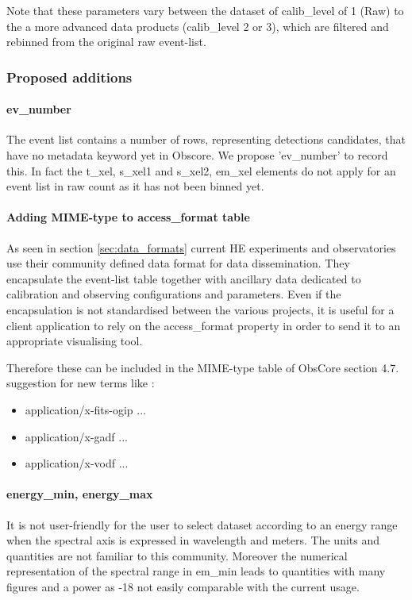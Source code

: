 \documentclass[11pt,a4paper]{ivoa}
\begin{document}
{Note that these parameters vary between the dataset of calib\_level of 1 (Raw) to the a more advanced data products (calib\_level 2 or 3), which are filtered and rebinned from the original raw event-list.


\subsubsection{Proposed additions}

\paragraph{ev\_number}
The event list contains a number of rows, representing detections candidates, that have no metadata keyword yet in Obscore.
We propose 'ev\_number' to record this.
In fact the t\_xel, s\_xel1 and s\_xel2, em\_xel elements do not apply for an event list in raw count as it has not been binned yet.

\paragraph{Adding MIME-type to access\_format table}
As seen in section \ref{sec:data_formats} current HE experiments and observatories use their community defined data format for data dissemination.
They encapsulate the event-list table together with ancillary data dedicated to calibration and observing configurations and parameters.
Even if the encapsulation is not standardised between the various projects, it is useful for a client application to rely on the access\_format property in order to send it to an appropriate visualising tool.

Therefore these can be included in the MIME-type table of ObsCore section 4.7. suggestion for new terms like :
\begin{itemize}
\item application/x-fits-ogip ...
\item application/x-gadf  ...
\item application/x-vodf  ...
\end{itemize}

\paragraph{energy\_min, energy\_max}
It is not user-friendly for the user to select dataset according to an energy range when the spectral axis is expressed in wavelength and meters. The units and quantities are not familiar to this community.
Moreover the numerical representation of the spectral range in em\_min leads to quantities with many figures and a power as -18 not easily comparable with the current usage.

}
\end{document}
